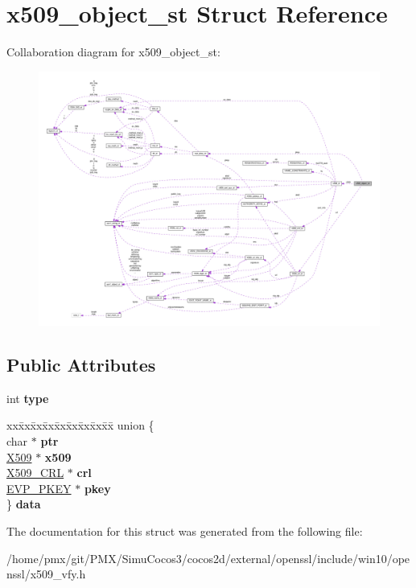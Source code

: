 \hypertarget{structx509__object__st}{}\section{x509\+\_\+object\+\_\+st Struct Reference}
\label{structx509__object__st}


Collaboration diagram for x509\+\_\+object\+\_\+st\+:
\nopagebreak
\begin{figure}[H]
\begin{center}
\leavevmode
\includegraphics[width=350pt]{structx509__object__st__coll__graph}
\end{center}
\end{figure}
\subsection*{Public Attributes}
\begin{DoxyCompactItemize}
\item 
\mbox{\label{structx509__object__st_a9a1693800fb57bf3d3e2f47d2f57ea60}} 
int {\bfseries type}
\item 
\mbox{\label{structx509__object__st_ae74b60c4f0615d02b558e91682ccdf28}} 
\begin{tabbing}
xx\=xx\=xx\=xx\=xx\=xx\=xx\=xx\=xx\=\kill
union \{\\
\>char $\ast$ {\bfseries ptr}\\
\>\hyperlink{structx509__st}{X509} $\ast$ {\bfseries x509}\\
\>\hyperlink{structX509__crl__st}{X509\_CRL} $\ast$ {\bfseries crl}\\
\>\hyperlink{structevp__pkey__st}{EVP\_PKEY} $\ast$ {\bfseries pkey}\\
\} {\bfseries data}\\

\end{tabbing}\end{DoxyCompactItemize}


The documentation for this struct was generated from the following file\+:\begin{DoxyCompactItemize}
\item 
/home/pmx/git/\+P\+M\+X/\+Simu\+Cocos3/cocos2d/external/openssl/include/win10/openssl/x509\+\_\+vfy.\+h\end{DoxyCompactItemize}
